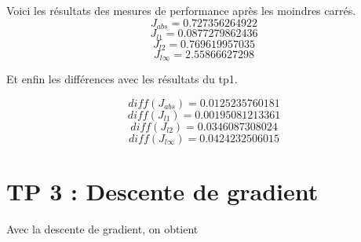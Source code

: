 \documentclass[a4paper,10pt]{report}
\begin{document}
Voici les résultats des mesures de performance après les moindres carrés.
$$J_{abs} = 0.727356264922$$
$$J_{l1} = 0.0877279862436 $$
$$J_{l2} = 0.769619957035$$
$$J_{l\infty} = 2.55866627298$$

Et enfin les différences avec les résultats du tp1.

$$diff(J_{abs}) =  0.0125235760181$$
$$diff(J_{l1}) = 0.00195081213361$$
$$diff(J_{l2}) =  0.0346087308024$$
$$diff(J_{l\infty}) = 0.0424232506015$$

\section{TP 3 : Descente de gradient }
Avec la descente de gradient, on obtient 

\begin{abstract}
\end{abstract}
\end{document}
